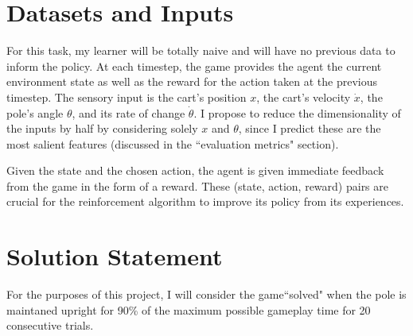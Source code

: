 \documentclass[12pt,a4paper]{article}
\begin{document}
\section*{Datasets and Inputs}
%
%
For this task, my learner will be totally naive and will have no previous data to inform the policy. At each timestep, the game provides the agent the current environment state as well as the reward for the action taken at the previous timestep.  The sensory input is the cart's position $x$, the cart's velocity $\dot x$, the pole's angle $\theta$, and its rate of change $\dot\theta$.\cite{state_def} I propose to reduce the dimensionality of the inputs by half by considering solely $x$ and $\theta$, since I predict these are the most salient features (discussed in the ``evaluation metrics" section).

Given the state and the chosen action, the agent is given immediate feedback from the game in the form of a reward. These (state, action, reward) pairs are crucial for the reinforcement algorithm to improve its policy from its experiences.

\section*{Solution Statement}
%

For the purposes of this project, I will consider the game``solved" when the pole is maintaned upright for 90\% of the maximum possible gameplay time for 20 consecutive trials.
\end{document}
